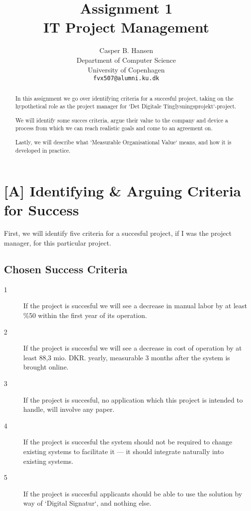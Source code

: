 \documentclass[11pt]{article}
\title
{
    Assignment 1\\
    {\large IT Project Management}
}
\author
{
    Casper B. Hansen\\
    Department of Computer Science\\
    University of Copenhagen\\
    {\tt fvx507@alumni.ku.dk}
}
\newcommand{\colbreak}{\vfill*\columnbreak}
\begin{document}
\maketitle
\begin{multicols}{2}
    \begin{abstract}
    In this assignment we go over identifying criteria for a succesful project,
    taking on the hypothetical role as the project manager for `Det Digitale
    Tinglysningsprojekt`-project.

    We will identify some succes criteria, argue their value to the company
    and device a process from which we can reach realistic goals and come to
    an agreement on.

    Lastly, we will describe what `Measurable Organisational Value` means, and
    how it is developed in practice.
    \end{abstract}
\colbreak
    \tableofcontents
\end{multicols}
\thispagestyle{empty}
\clearpage

\section{[A] Identifying \& Arguing Criteria for Success}
First, we will identify five criteria for a succesful project, if I was the
project manager, for this particular project.

\subsection{Chosen Success Criteria}
\begin{description}
    \item[1] If the project is succesful we will see a decrease in manual
        labor by at least \%50 within the first year of its operation.
    \item[2] If the project is succesful we will see a decrease in cost of
        operation by at least 88,3 mio. DKR. yearly, measurable 3 months
        after the system is brought online.
    \item[3] If the project is succesful, no application which this project
        is intended to handle, will involve any paper.
    \item[4] If the project is succesful the system should not be required
        to change existing systems to facilitate it --- it should integrate
        naturally into existing systems.
    \item[5] If the project is succesful applicants should be able to use the
        solution by way of `Digital Signatur`, and nothing else.
\end{description}
\end{document}
